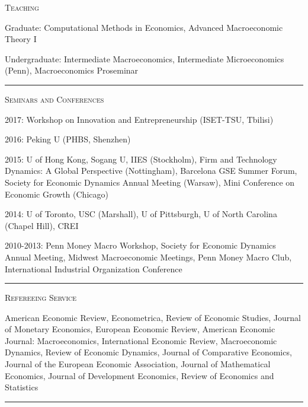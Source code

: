 \documentclass{article}
\begin{document}
\parbox{\textwidth}{
\parbox[t]{0.28\textwidth}{ \raggedright \noindent \textsc{ Teaching } }
\parbox[t]{0.72\textwidth}{ \raggedright

Graduate: Computational Methods in Economics, Advanced Macroeconomic Theory I
\vspace{0.27cm}

Undergraduate: Intermediate Macroeconomics, Intermediate Microeconomics (Penn), Macroeconomics Proseminar
\vspace{0.27cm}

}
\textcolor{light-gray}{\hrule}
}
\vspace{0.3cm}

\parbox{\textwidth}{
\parbox[t]{0.28\textwidth}{ \raggedright \noindent \textsc{ Seminars and Conferences } }
\parbox[t]{0.72\textwidth}{ \raggedright

2017: Workshop on Innovation and Entrepreneurship (ISET-TSU, Tbilisi)
\vspace{0.27cm}

2016: Peking U (PHBS, Shenzhen)
\vspace{0.27cm}

2015: U of Hong Kong, Sogang U, IIES (Stockholm), Firm and Technology Dynamics: A Global Perspective (Nottingham), Barcelona GSE Summer Forum, Society for Economic Dynamics Annual Meeting (Warsaw), Mini Conference on Economic Growth (Chicago)
\vspace{0.27cm}

2014: U of Toronto, USC (Marshall), U of Pittsburgh, U of North Carolina (Chapel Hill), CREI
\vspace{0.27cm}

2010-2013: Penn Money Macro Workshop, Society for Economic Dynamics Annual Meeting, Midwest Macroeconomic Meetings, Penn Money Macro Club, International Industrial Organization Conference
\vspace{0.27cm}

}
\textcolor{light-gray}{\hrule}
}
\vspace{0.3cm}

\parbox{\textwidth}{
\parbox[t]{0.28\textwidth}{ \raggedright \noindent \textsc{ Refereeing Service } }
\parbox[t]{0.72\textwidth}{ \raggedright

American Economic Review, Econometrica, Review of Economic Studies, Journal of Monetary Economics, European Economic Review, American Economic Journal: Macroeconomics, International Economic Review, Macroeconomic Dynamics, Review of Economic Dynamics, Journal of Comparative Economics, Journal of the European Economic Association, Journal of Mathematical Economics, Journal of Development Economics, Review of Economics and Statistics
\vspace{0.27cm}

}
\textcolor{light-gray}{\hrule}
}
\vspace{0.3cm}
\end{document}
